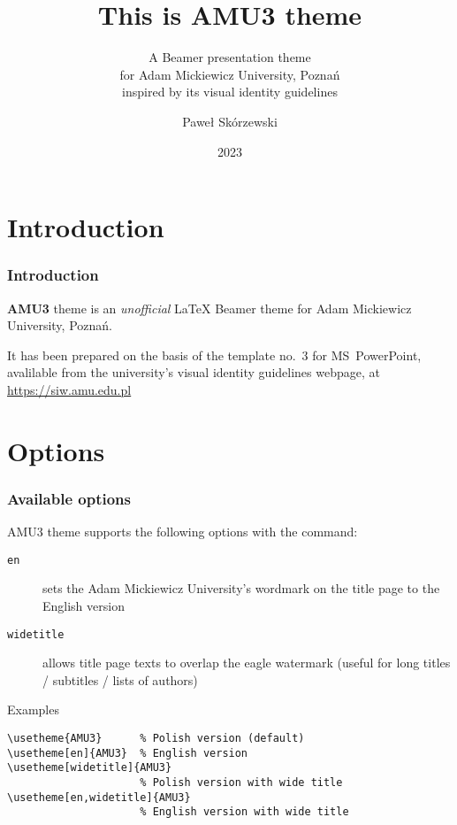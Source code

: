 \documentclass{beamer}
\title[AMU3 Beamer theme]{This is AMU3 theme}
\subtitle{A Beamer presentation theme\\for Adam Mickiewicz University, Pozna{\'n}\\inspired by its visual identity guidelines}
\author[{P. Sk{\'o}rzewski}]{Pawe{\l} Sk{\'o}rzewski}
\date{2023}
\institute[zpjn.wmi.amu.edu.pl]{Faculty of Mathematics and Computer Science\\Department of Natural Language Processing}
\begin{document}
\begin{frame}
  \titlepage
\end{frame}


\section{Introduction}

\begin{frame}
  \frametitle{Introduction}
  \textbf{AMU3} theme is an \emph{unofficial} \LaTeX{} Beamer theme for Adam Mickiewicz University, Poznań.

  \medskip

  It has been prepared on the basis of the template no.~3 for MS~PowerPoint, avalilable from the university's visual identity guidelines webpage, at \url{https://siw.amu.edu.pl}
\end{frame}

\section{Options}

\begin{frame}[containsverbatim]
  \frametitle{Available options}
  AMU3 theme supports the following options with the
  \texttt{} command:
  \begin{description}
    \item [\texttt{en}] sets the Adam Mickiewicz University's wordmark on the title page to the English version
    \item [\texttt{widetitle}] allows title page texts to overlap the eagle watermark (useful for long titles / subtitles / lists of authors)
  \end{description}
  \begin{exampleblock}{Examples}
    \begin{verbatim}
\usetheme{AMU3}      % Polish version (default)
\usetheme[en]{AMU3}  % English version
\usetheme[widetitle]{AMU3}
                     % Polish version with wide title
\usetheme[en,widetitle]{AMU3}
                     % English version with wide title
    \end{verbatim}
  \end{exampleblock}
\end{frame}
\end{document}
